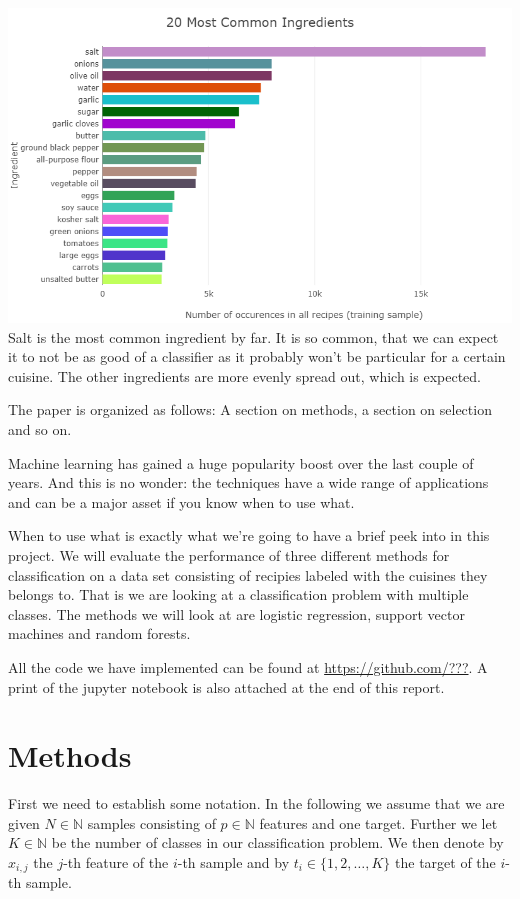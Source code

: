 \documentclass[parskip=half]{scrartcl}
\theoremstyle{definition}
\theoremstyle{remark}
\newcommand{\N}{\mathbb{N}}
\begin{document}
\includegraphics[scale=.55]{images/common_ing}
Salt is the most common ingredient by far. It is so common, that we can expect it to not be as good of a classifier as it probably won't be particular for a certain cuisine.
The other ingredients are more evenly spread out, which is expected.

The paper is organized as follows: A section on methods, a section on selection and so on. 


Machine learning has gained a huge popularity boost over the last couple of years. 
And this is no wonder: the techniques 
have a wide range of applications and can be a major asset
if you know when to use what.
\par
When to use what is exactly what we're going to have a brief
peek into in this project. 
We will evaluate the performance of three different methods for
classification on a data set consisting of recipies labeled with 
the cuisines they belongs to. That is we are looking at a classification 
problem with multiple classes. The methods we will look at are
logistic regression, support vector machines and random forests.

\begin{framed}
All the code we have implemented can be found at \url{https://github.com/???}.
A print of the jupyter notebook is also attached at the end of this report.
\end{framed}

\section{Methods} \label{sec:methods}

First we need to establish some notation. In the following we assume
that we are given $N \in \N$ samples consisting of $p \in \N$ features
and one target. Further we let $K \in \N$ be the number of
classes in our classification problem. We then denote by $x_{i,j}$ the
$j$-th feature of the $i$-th sample and by $t_i \in \{1,2, \dots, K\}$
the target of the $i$-th sample. 
\end{document}
